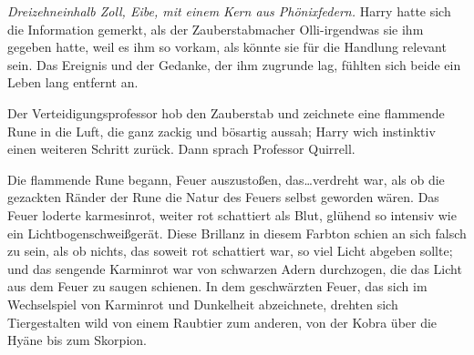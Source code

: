 \emph{Dreizehneinhalb Zoll, Eibe, mit einem Kern aus Phönixfedern.}
Harry hatte sich die Information gemerkt, als der Zauberstabmacher Olli-irgendwas sie ihm gegeben hatte, weil es ihm so vorkam, als könnte sie für die Handlung relevant sein. Das Ereignis und der Gedanke, der ihm zugrunde lag, fühlten sich beide ein Leben lang entfernt an.

Der Verteidigungsprofessor hob den Zauberstab und zeichnete eine flammende Rune in die Luft, die ganz zackig und bösartig aussah; Harry wich instinktiv einen weiteren Schritt zurück.
Dann sprach Professor Quirrell.

Die flammende Rune begann, Feuer auszustoßen, das…verdreht war, als ob die gezackten Ränder der Rune die Natur des Feuers selbst geworden wären. Das Feuer loderte karmesinrot, weiter rot schattiert als Blut, glühend so intensiv wie ein Lichtbogenschweißgerät. Diese Brillanz in diesem Farbton schien an sich falsch zu sein, als ob nichts, das soweit rot schattiert war, so viel Licht abgeben sollte; und das sengende Karminrot war von schwarzen Adern durchzogen, die das Licht aus dem Feuer zu saugen schienen. In dem geschwärzten Feuer, das sich im Wechselspiel von Karminrot und Dunkelheit abzeichnete, drehten sich Tiergestalten wild von einem Raubtier zum anderen, von der Kobra über die Hyäne bis zum Skorpion.

